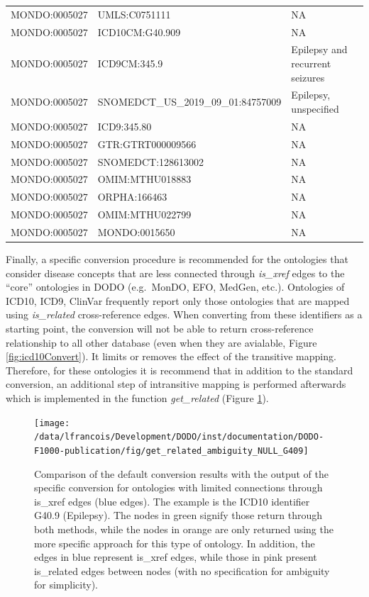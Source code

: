 \documentclass[9pt,a4paper,]{extarticle}
\begin{document}
\begin{table}
{\begin{tabular}[t]{lll}
\rowcolor{gray!6}  MONDO:0005027 & UMLS:C0751111 & NA\\
MONDO:0005027 & ICD10CM:G40.909 & NA\\
\rowcolor{gray!6}  MONDO:0005027 & ICD9CM:345.9 & Epilepsy and recurrent seizures\\
\addlinespace
MONDO:0005027 & SNOMEDCT\_US\_2019\_09\_01:84757009 & Epilepsy, unspecified\\
\rowcolor{gray!6}  MONDO:0005027 & ICD9:345.80 & NA\\
MONDO:0005027 & GTR:GTRT000009566 & NA\\
\rowcolor{gray!6}  MONDO:0005027 & SNOMEDCT:128613002 & NA\\
MONDO:0005027 & OMIM:MTHU018883 & NA\\
\addlinespace
\rowcolor{gray!6}  MONDO:0005027 & ORPHA:166463 & NA\\
MONDO:0005027 & OMIM:MTHU022799 & NA\\
\rowcolor{gray!6}  MONDO:0005027 & MONDO:0015650 & NA\\
\bottomrule
\end{tabular}}
\end{table}

Finally, a specific conversion procedure is recommended for the ontologies that consider disease concepts that are less connected through \emph{is\_xref} edges to the ``core'' ontologies in DODO (e.g.~MonDO, EFO, MedGen, etc.). Ontologies of ICD10, ICD9, ClinVar frequently report only those ontologies that are mapped using \emph{is\_related} cross-reference edges. When converting from these identifiers as a starting point, the conversion will not be able to return cross-reference relationship to all other database (even when they are avialable, Figure \ref{fig:icd10Convert}). It limits or removes the effect of the transitive mapping. Therefore, for these ontologies it is recommend that in addition to the standard conversion, an additional step of intransitive mapping is performed afterwards which is implemented in the function \emph{get\_related} (Figure \ref{fig:getRelated}).

\begin{figure}

{\centering \texttt{[image: /data/lfrancois/Development/DODO/inst/documentation/DODO-F1000-publication/fig/get\_related\_ambiguity\_NULL\_G409]} 

}

\caption{Comparison of the default conversion results with the output of the specific conversion for ontologies with limited connections through is\_xref edges (blue edges). The example is the ICD10 identifier G40.9 (Epilepsy). The nodes in green signify those return through both methods, while the nodes in orange are only returned using the more specific approach for this type of ontology. In addition, the edges in blue represent is\_xref edges, while those in pink present is\_related edges between nodes (with no specification for ambiguity for simplicity).}\label{fig:getRelated}
\end{figure}
\end{document}
